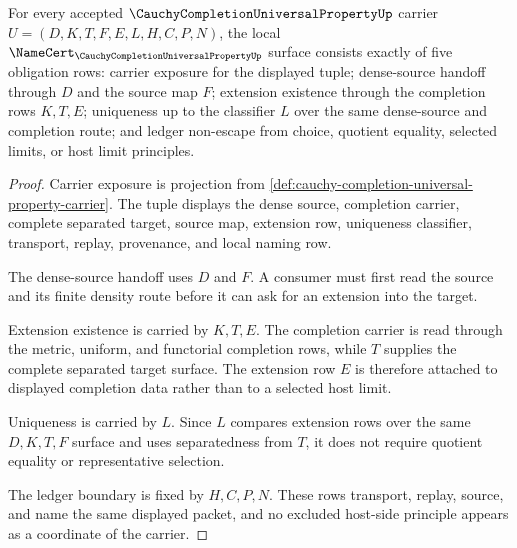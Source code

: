 \begin{theorem}
\label{thm:cauchy-completion-universal-property-namecert-obligations}
For every accepted $\CauchyCompletionUniversalPropertyUp$ carrier $U=(D,K,T,F,E,L,H,C,P,N)$, the local $\NameCert_{\CauchyCompletionUniversalPropertyUp}$ surface consists exactly of five obligation rows: carrier exposure for the displayed tuple; dense-source handoff through $D$ and the source map $F$; extension existence through the completion rows $K,T,E$; uniqueness up to the classifier $L$ over the same dense-source and completion route; and ledger non-escape from choice, quotient equality, selected limits, or host limit principles.
\end{theorem}
\begin{proof}
Carrier exposure is projection from \autoref{def:cauchy-completion-universal-property-carrier}. The tuple displays the dense source, completion carrier, complete separated target, source map, extension row, uniqueness classifier, transport, replay, provenance, and local naming row.

The dense-source handoff uses $D$ and $F$. A consumer must first read the source and its finite density route before it can ask for an extension into the target.

Extension existence is carried by $K,T,E$. The completion carrier is read through the metric, uniform, and functorial completion rows, while $T$ supplies the complete separated target surface. The extension row $E$ is therefore attached to displayed completion data rather than to a selected host limit.

Uniqueness is carried by $L$. Since $L$ compares extension rows over the same $D,K,T,F$ surface and uses separatedness from $T$, it does not require quotient equality or representative selection.

The ledger boundary is fixed by $H,C,P,N$. These rows transport, replay, source, and name the same displayed packet, and no excluded host-side principle appears as a coordinate of the carrier.
\end{proof}


